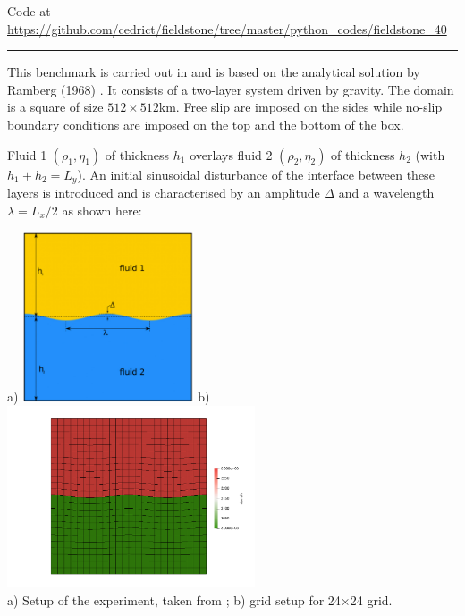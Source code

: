 

\begin{center}
Code at \url{https://github.com/cedrict/fieldstone/tree/master/python_codes/fieldstone_40}
\end{center}

\par\noindent\rule{\textwidth}{0.4pt}

This benchmark is carried out in \cite{deka08,gery10,thie11} and is 
based on the analytical solution by Ramberg (1968) \cite{ramb68}. 
It consists of a two-layer system driven by gravity. 
The domain is a square of size $512\times512$km. 
Free slip are imposed on the sides while no-slip boundary conditions are imposed on the
top and the bottom of the box.

Fluid 1 $(\rho_1,\eta_1)$ of thickness $h_1$ overlays 
fluid 2 $(\rho_2,\eta_2)$ of thickness $h_2$ (with $h_1+h_2=L_y$).
An initial sinusoidal disturbance of the interface between these
layers is introduced and is characterised by an amplitude $\Delta$ and a
wavelength $\lambda=L_x/2$ as shown here: 

\begin{center}
a) \includegraphics[width=0.38\textwidth]{python_codes/fieldstone_40/images/setup}
b) \includegraphics[width=0.55\textwidth]{python_codes/fieldstone_40/images/dens}\\
{\captionfont  a) Setup of the experiment, taken from \cite{thie11}; b) grid setup for 24$\times$24 grid.} 
\end{center}

